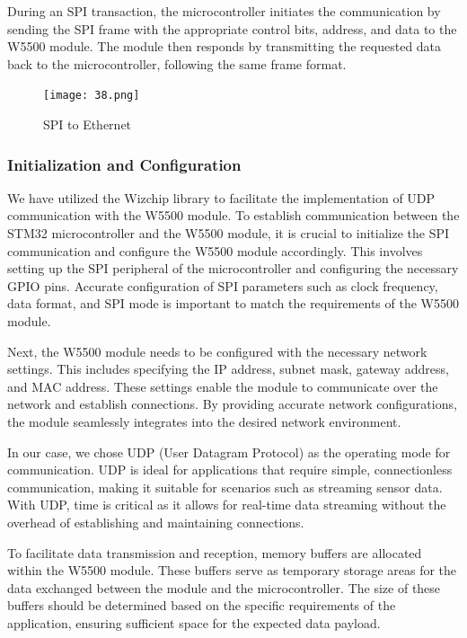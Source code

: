 \documentclass[
12pt,
oneside, 
onehalfspacing, 
nolistspacing, 
parskip, 
chapterinoneline, 
]{AASTCOMPUTER}
\begin{document}
During an SPI transaction, the microcontroller initiates the communication by sending the SPI frame with the appropriate control bits, address, and data to the W5500 module. The module then responds by transmitting the requested data back to the microcontroller, following the same frame format.
\begin{figure}[!ht]
\centering
\texttt{[image: 38.png]}
\caption[SPI to Ethernet]{SPI to Ethernet}
\label{fig:SPI to Ethernet}
\end{figure}

\subsubsection{Initialization and Configuration}

We have utilized the Wizchip library to facilitate the implementation of UDP communication with the W5500 module. To establish communication between the STM32 microcontroller and the W5500 module, it is crucial to initialize the SPI communication and configure the W5500 module accordingly. This involves setting up the SPI peripheral of the microcontroller and configuring the necessary GPIO pins. Accurate configuration of SPI parameters such as clock frequency, data format, and SPI mode is important to match the requirements of the W5500 module.

Next, the W5500 module needs to be configured with the necessary network settings. This includes specifying the IP address, subnet mask, gateway address, and MAC address. These settings enable the module to communicate over the network and establish connections. By providing accurate network configurations, the module seamlessly integrates into the desired network environment.

In our case, we chose UDP (User Datagram Protocol) as the operating mode for communication. UDP is ideal for applications that require simple, connectionless communication, making it suitable for scenarios such as streaming sensor data. With UDP, time is critical as it allows for real-time data streaming without the overhead of establishing and maintaining connections.

To facilitate data transmission and reception, memory buffers are allocated within the W5500 module. These buffers serve as temporary storage areas for the data exchanged between the module and the microcontroller. The size of these buffers should be determined based on the specific requirements of the application, ensuring sufficient space for the expected data payload.
\end{document}
